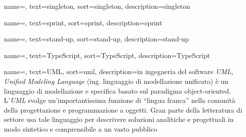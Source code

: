 {
    name=,
    text=singleton,
    sort=singleton,
    description={singleton}
}

{
    name=,
    text=sprint,
    sort=sprint,
    description={sprint}
}

{
    name=,
    text=stand-up,
    sort=stand-up,
    description={stand-up}
}

{
    name=,
    text=TypeScript,
    sort=TypeScript,
    description={TypeScript}
}

{
    name=,
    text=UML,
    sort=uml,
    description={in ingegneria del software \emph{UML, Unified Modeling Language} (ing. linguaggio di modellazione unificato) è un linguaggio di modellazione e specifica basato sul paradigma object-oriented. L'\emph{UML} svolge un'importantissima funzione di ``lingua franca'' nella comunità della progettazione e programmazione a oggetti. Gran parte della letteratura di settore usa tale linguaggio per descrivere soluzioni analitiche e progettuali in modo sintetico e comprensibile a un vasto pubblico}
}
